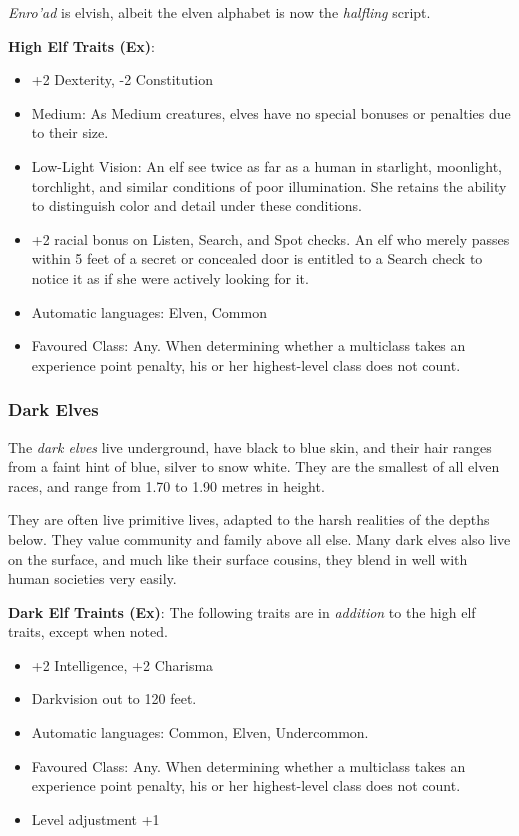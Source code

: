 \begin{35e}
  \emph{Enro'ad} is elvish, albeit the elven alphabet is now the \emph{halfling}
  script.

  \textbf{High Elf Traits (Ex)}:
  \begin{itemize}[noitemsep]
    \item +2 Dexterity, -2 Constitution
    \item Medium: As Medium creatures, elves have no special bonuses or
    penalties due to their size.
    \item Low-Light Vision: An elf see twice as far as a human in starlight,
    moonlight, torchlight, and similar conditions of poor illumination. She
    retains the ability to distinguish color and detail under these
    conditions.
    \item +2 racial bonus on Listen, Search, and Spot checks. An elf who
    merely passes within 5 feet of a secret or concealed door is entitled to a
    Search check to notice it as if she were actively looking for it.
    \item Automatic languages: Elven, Common
    \item Favoured Class: Any. When determining whether a multiclass takes an
    experience point penalty, his or her highest-level class does not count.
  \end{itemize}
\end{35e}

\subsubsection*{Dark Elves}

The \emph{dark elves} live underground, have black to blue skin, and their
hair ranges from a faint hint of blue, silver to snow white. They are the
smallest of all elven races, and range from 1.70 to 1.90 metres in height.

They are often live primitive lives, adapted to the harsh realities of the
depths below. They value community and family above all else. Many dark elves
also live on the surface, and much like their surface cousins, they blend in
well with human societies very easily.

\begin{35e}
  \textbf{Dark Elf Traints (Ex)}: The following traits are in \emph{addition}
  to the high elf traits, except when noted.
  \begin{itemize}[noitemsep]
    \item +2 Intelligence, +2 Charisma
    \item Darkvision out to 120 feet.
    \item Automatic languages: Common, Elven, Undercommon.
    \item Favoured Class: Any. When determining whether a multiclass takes an
    experience point penalty, his or her highest-level class does not count.
    \item Level adjustment +1
  \end{itemize}
\end{35e}

